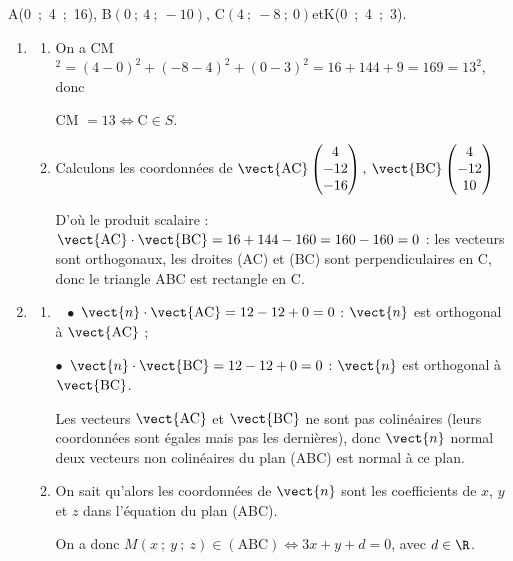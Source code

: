 \medskip


\begin{center}A(0~;~4~;~16), \quad B$(0~;~4~;~- 10)$, \quad C$(4~;~-8~;~0)$\quad et\quad  K(0~;~4~;~3).\end{center}




\medskip

\begin{enumerate}
\item 
	\begin{enumerate}
		\item 
		On a CM$^2 = (4 - 0)^2 + (- 8 - 4)^2 + (0 - 3)^2 = 16 + 144 + 9 = 169 = 13^2$, donc 
		
CM $ = 13 \iff \text{C} \in S$.
		\item 
Calculons les coordonnées de $\vect{\text{AC}}\begin{pmatrix}4\\-12\\-16\end{pmatrix}, \: \vect{\text{BC}}\begin{pmatrix}4\\-12\\10\end{pmatrix}$

D'où le produit scalaire : $\vect{\text{AC}} \cdot \vect{\text{BC}} = 16 + 144 - 160 = 160 - 160 = 0$ : les vecteurs sont orthogonaux, les droites (AC) et (BC) sont perpendiculaires en C, donc le triangle ABC est rectangle en C.
	\end{enumerate}
\item 
	\begin{enumerate}
		\item ~
$\bullet~~$$\vect{n} \cdot \vect{\text{AC}} = 12 - 12 + 0 = 0$ : $\vect{n}$ est orthogonal à $\vect{\text{AC}}$ ;

$\bullet~~$$\vect{n} \cdot \vect{\text{BC}} = 12 - 12 + 0 = 0$ : $\vect{n}$ est orthogonal à $\vect{\text{BC}}$.

Les vecteurs $\vect{\text{AC}}$ et $\vect{\text{BC}}$ ne sont pas colinéaires (leurs coordonnées sont égales mais pas les dernières), donc $\vect{n}$ normal deux vecteurs non colinéaires du plan (ABC) est normal à ce plan.
		\item 
		On sait qu'alors les coordonnées de $\vect{n}$ sont les coefficients de $x$, \: $y$ et $z$ dans l'équation du plan (ABC).
		
On a donc $M(x~;~y~;~z) \in (\text{ABC}) \iff 3x + y + d = 0$, avec $d \in \R$.
		

\end{enumerate}
\end{enumerate}
